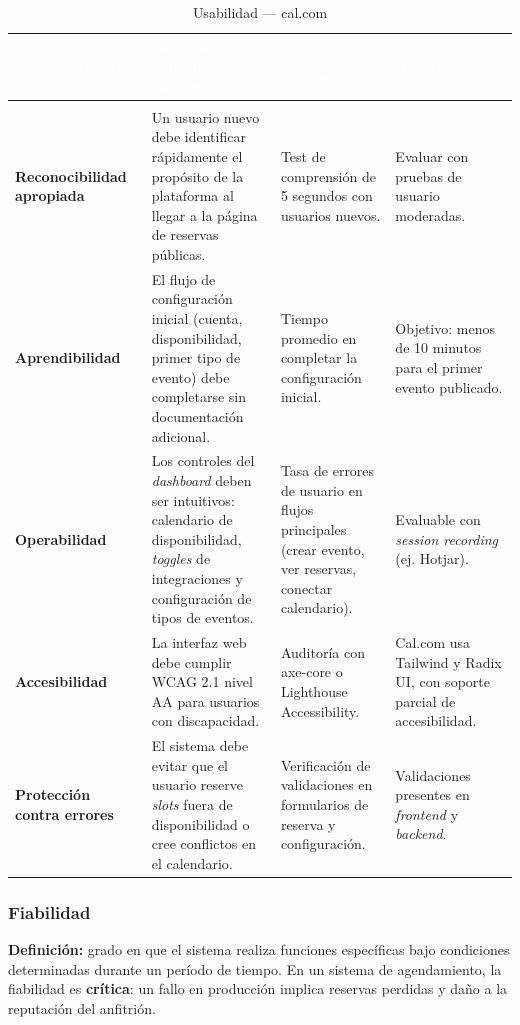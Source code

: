 \documentclass[12pt, a4paper]{article}
\newcommand{\rowpair}{\rowcolor{grisMedio}}
\newcommand{\rowimpar}{\rowcolor{grisClaro}}
\begin{document}
\begin{longtable}{>{\bfseries}p{3cm} p{4.5cm} p{4cm} p{3.5cm}}
\caption{Usabilidad — cal.com} \label{tab:usabilidad} \\
\rowcolor{azulClaro}
\textcolor{white}{\textbf{Subcaracterística}} &
\textcolor{white}{\textbf{Descripción aplicada a cal.com}} &
\textcolor{white}{\textbf{Criterio de evaluación}} &
\textcolor{white}{\textbf{Observaciones}} \\
\endfirsthead
\multicolumn{4}{c}{\tablename\ \thetable{} -- continuación} \\
\endhead
\rowpair
Reconocibilidad apropiada &
Un usuario nuevo debe identificar rápidamente el propósito de la plataforma al llegar a
la página de reservas públicas. &
Test de comprensión de 5 segundos con usuarios nuevos. &
Evaluar con pruebas de usuario moderadas. \\
\rowimpar
Aprendibilidad &
El flujo de configuración inicial (cuenta, disponibilidad, primer tipo de evento) debe
completarse sin documentación adicional. &
Tiempo promedio en completar la configuración inicial. &
Objetivo: menos de 10 minutos para el primer evento publicado. \\
\rowpair
Operabilidad &
Los controles del \textit{dashboard} deben ser intuitivos: calendario de disponibilidad,
\textit{toggles} de integraciones y configuración de tipos de eventos. &
Tasa de errores de usuario en flujos principales (crear evento, ver reservas, conectar
calendario). &
Evaluable con \textit{session recording} (ej. Hotjar). \\
\rowimpar
Accesibilidad &
La interfaz web debe cumplir WCAG 2.1 nivel AA para usuarios con discapacidad. &
Auditoría con axe-core o Lighthouse Accessibility. &
Cal.com usa Tailwind y Radix UI, con soporte parcial de accesibilidad. \\
\rowpair
Protección contra errores &
El sistema debe evitar que el usuario reserve \textit{slots} fuera de disponibilidad o
cree conflictos en el calendario. &
Verificación de validaciones en formularios de reserva y configuración. &
Validaciones presentes en \textit{frontend} y \textit{backend}. \\
\end{longtable}

\subsubsection{Fiabilidad}

\textbf{Definición:} grado en que el sistema realiza funciones específicas bajo
condiciones determinadas durante un período de tiempo. En un sistema de agendamiento,
la fiabilidad es \textbf{crítica}: un fallo en producción implica reservas perdidas y
daño a la reputación del anfitrión.
\end{document}
